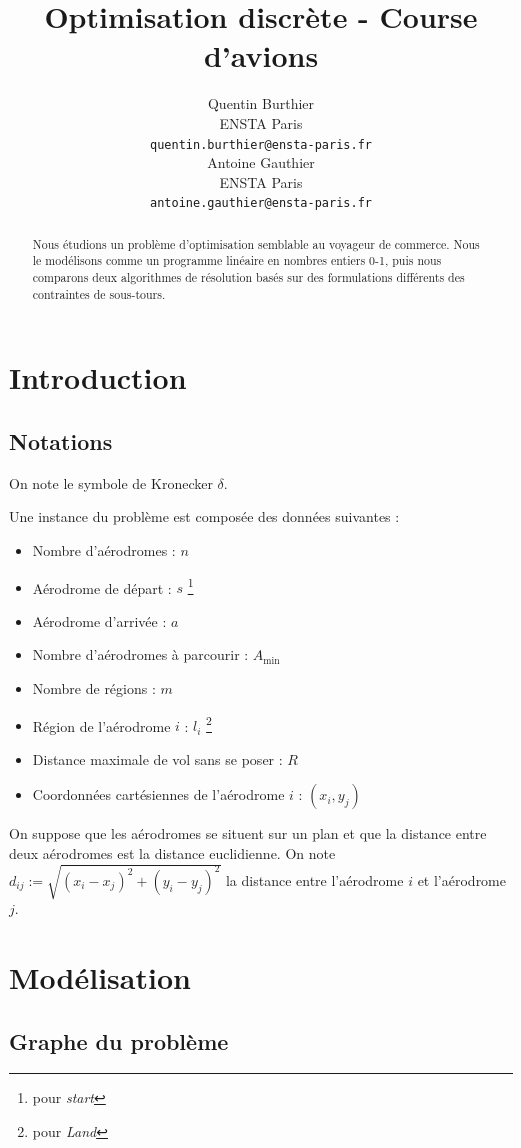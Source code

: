 \documentclass{article}
\title{Optimisation discrète - Course d'avions}
\author{
  Quentin Burthier
  \\
  ENSTA Paris\\
  \texttt{quentin.burthier@ensta-paris.fr} \\
  \And
  Antoine Gauthier \\
  ENSTA Paris \\
  \texttt{antoine.gauthier@ensta-paris.fr} \\
}
\newcommand{\dij}{d_{ij}}
\newcommand{\Amin}{A_\text{min}}
\begin{document}
\maketitle

\begin{abstract}
  Nous étudions un problème d'optimisation semblable au voyageur de commerce.
  Nous le modélisons comme un programme linéaire en nombres entiers 0-1,
  puis nous comparons deux algorithmes de résolution basés sur des formulations
  différents des contraintes de sous-tours.
\end{abstract}
\section{Introduction}

\subsection{Notations}

On note le symbole de Kronecker $\delta$.

Une instance du problème est composée des données suivantes :
\begin{itemize}
  \item Nombre d'aérodromes : $n$
  \item Aérodrome de départ : $s$ \footnote{pour \textit{start}}
  \item Aérodrome d'arrivée : $a$
  \item Nombre d'aérodromes à parcourir : $\Amin$
  \item Nombre de régions : $m$
  \item Région de l'aérodrome $i$ : $l_i$ \footnote{pour \textit{Land}}
  \item Distance maximale de vol sans se poser : $R$
  \item Coordonnées cartésiennes de l'aérodrome $i$ : $(x_i, y_j)$
\end{itemize}

On suppose que les aérodromes se situent sur un plan et que la distance entre
deux aérodromes est la distance euclidienne. 
On note $\dij := \sqrt{(x_i - x_j)^2 + (y_i - y_j)^2}$ la distance entre 
l'aérodrome $i$ et l'aérodrome $j$.

\section{Modélisation}

\subsection{Graphe du problème}
\end{document}
